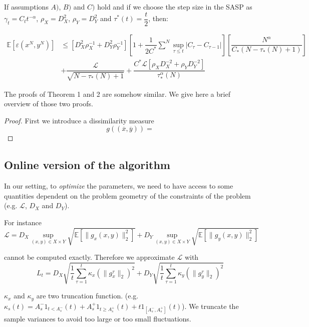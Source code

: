 \documentclass[10pt]{article}
\begin{document}
\begin{thm}
If assumptions $A)$, $B)$ and $C)$ hold and if we choose the step size in the SASP as $\gamma_{t} = C_{t}t^{-\alpha}$,
$\rho_{X} = D_{X}^{2}$, $\rho_{Y} = D_{Y}^{2}$ and $\tau^{*}(t) = \dfrac{t}{2}$, then:

\begin{align*}
\mathbb{E}[\varepsilon(x^{N},y^{N})] &\leq [D_{X}^{2}\rho_{X}^{-1} + D_{Y}^{2}\rho_{Y}^{-1} ][1 + \dfrac{1}{2C^{*}}\sum_{}^{N}\sup_{\tau \leq t} | C_{\tau} - C_{\tau-1}|]
[\dfrac{N^{\alpha}}{C_{*}(N - \tau_{*}(N) + 1)}] \\ 
&+ \dfrac{\mathcal{L}}{\sqrt{N - \tau_{*}(N)+ 1}} + \dfrac{C^{*}\mathcal{L}[\rho_{X}D_{X}^{-2} + \rho_{Y}D_{Y}^{-2}]}{\tau_{*}^{\alpha}(N)}
\end{align*}
\end{thm}


The proofs of Theorem 1 and 2 are somehow similar.
We give here a brief overview of those two proofs.

\begin{proof}

First we introduce a dissimilarity measure
$$
g((\overline{x},\overline{y})) = 
$$

\end{proof}

\subsection{Online version of the algorithm}

In our setting, to \emph{optimize} the parameters, we need to have access to some quantities dependent on the problem geometry of the constraints of the problem (e.g. $\mathcal{L}$, $D_{X}$ and $D_{Y}$).

For instance
$$
\mathcal{L} = D_{X} \sup_{(x,y) \in X \times Y} \sqrt{\mathbb{E}[\lVert g_{x}(x,y) \rVert_{2}^{2}]} + 
D_{Y} \sup_{(x,y) \in X \times Y} \sqrt{\mathbb{E}[\lVert g_{y}(x,y) \rVert_{2}^{2}]}
$$

cannot be computed exactly.
Therefore we approximate $\mathcal{L}$ with  
$$
L_{t} = D_{X}\sqrt{\dfrac{1}{t}\sum_{\tau=1}^{t}\kappa_{x}(\lVert g_{x}^{\tau} \rVert_{2})^{2}} + D_{Y}\sqrt{\dfrac{1}{t}\sum_{\tau=1}^{t}  \kappa_{y}(\lVert g_{y}^{\tau} \rVert_{2})^{2}}
$$

$\kappa_{x}$ and $\kappa_{y}$ are two truncation function.
(e.g. $\kappa_{s}(t) = A_{s}^{-}1_{ t < A_{s}^{-}}(t) + A_{s}^{+}1_{ t \geq A_{s}^{+}}(t) + t 1_{ [A_{s}^{-}, A_{s}^{+}]}(t)$).
We truncate the sample variances to avoid too large or too small fluctuations.
%
%
\end{document}
